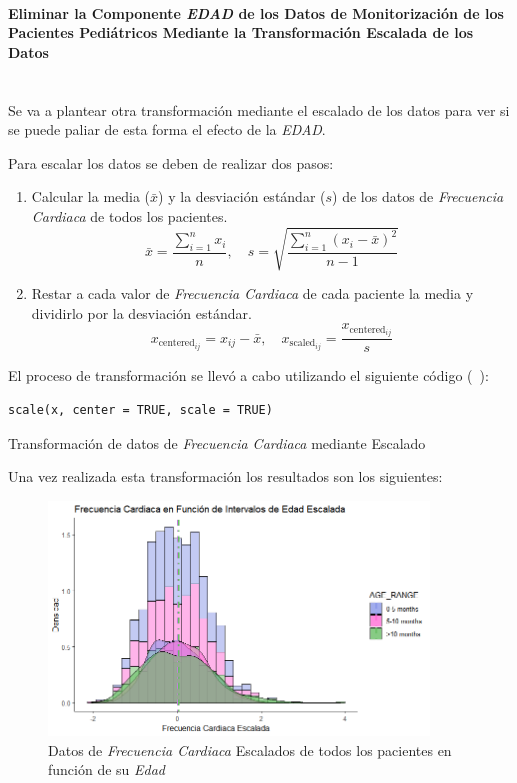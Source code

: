 \paragraph{Eliminar la Componente \textit{EDAD} de los Datos de Monitorización de los Pacientes Pediátricos Mediante la Transformación Escalada de los Datos}\label{sec:eliminar-edad-2} \\

Se va a plantear otra transformación mediante el escalado de los datos para ver si se puede paliar de esta forma el efecto de la \textit{EDAD}. 

Para escalar los datos se deben de realizar dos pasos:

\begin{enumerate}
    \item Calcular la media (\(\bar{x}\)) y la desviación estándar (\(s\)) de los datos de \textit{Frecuencia Cardiaca} de todos los pacientes.
    \[
        \bar{x} = \frac{\sum_{i=1}^{n} x_i}{n}, \quad s = \sqrt{\frac{\sum_{i=1}^{n} (x_i - \bar{x})^2}{n-1}}
    \]

    \item Restar a cada valor de \textit{Frecuencia Cardiaca} de cada paciente la media y dividirlo por la desviación estándar.
    \[
        x_{\text{centered}_{ij}} = x_{ij} - \bar{x}, \quad x_{\text{scaled}_{ij}} = \frac{x_{\text{centered}_{ij}}}{s}
    \]
\end{enumerate}

El proceso de transformación se llevó a cabo utilizando el siguiente código (~\cite{BeckerChambersWilks1988}):

\begin{code}[H]
    \begin{lstlisting}
scale(x, center = TRUE, scale = TRUE)
    \end{lstlisting}
    \caption{Transformación de datos de \textit{Frecuencia Cardiaca} mediante Escalado}\label{cod:transformacion-fc-escalado}
 \end{code}


Una vez realizada esta transformación los resultados son los siguientes: 


\begin{figure}[H]
    \centering
    \includegraphics[width=0.9\textwidth]{img/frecuencia-cardiaca-edad-escalada.png}
    \caption{Datos de \textit{Frecuencia Cardiaca} Escalados de todos los pacientes en función de su \textit{Edad}}
    \label{fig:frecuencia-cardiaca-edad-escala}
\end{figure}

